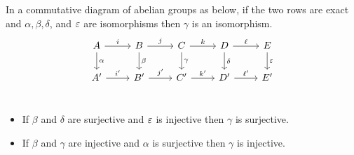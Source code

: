 
%

\begin{lemma}\label{lem:five}
  In a commutative diagram of abelian groups as below, if the two rows are exact and $\alpha,\beta,\delta$, and $\varepsilon$ are isomorphisms then $\gamma$ is an isomorphism.
  \[\begin{tikzcd}
      A\ar[r, "i"]\ar[d, "\alpha"]
    & B\ar[r, "j"]\ar[d, "\beta"]
    & C\ar[r, "k"]\ar[d, "\gamma"]
    & D\ar[r, "\ell"]\ar[d, "\delta"]
    & E\ar[d, "\e"]\\
      A'\ar[r, "i'"]
    & B'\ar[r, "j'"]
    & C'\ar[r, "k'"]
    & D'\ar[r, "\ell'"]
    & E'\\
  \end{tikzcd}\]

  \begin{itemize}
    \item If $\beta$ and $\delta$ are surjective and $\varepsilon$ is injective then $\gamma$ is surjective.
    \item If $\beta$ and $\gamma$ are injective and $\alpha$ is surjective then $\gamma$ is injective.
  \end{itemize}
\end{lemma}

